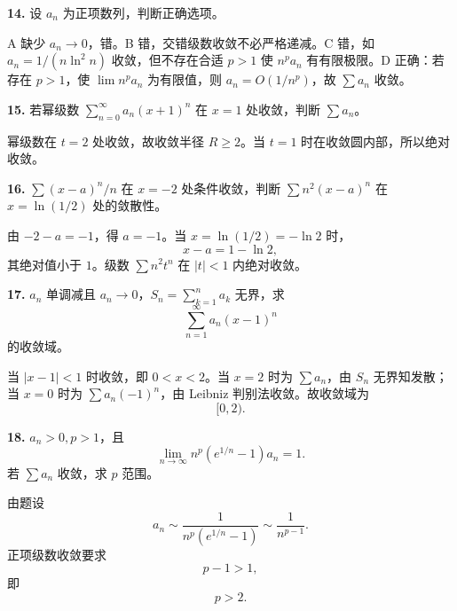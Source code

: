 \begin{problemblock}
\textbf{14.} 设 \(a_n\) 为正项数列，判断正确选项。
\end{problemblock}
\begin{solutionblock}
A 缺少 \(a_n\to0\)，错。B 错，交错级数收敛不必严格递减。C 错，如 \(a_n=1/(n\ln^2 n)\) 收敛，但不存在合适 \(p>1\) 使 \(n^pa_n\) 有有限极限。D 正确：若存在 \(p>1\)，使 \(\lim n^pa_n\) 为有限值，则 \(a_n=O(1/n^p)\)，故 \(\sum a_n\) 收敛。
\end{solutionblock}

\begin{problemblock}
\textbf{15.} 若幂级数 \(\sum_{n=0}^{\infty}a_n(x+1)^n\) 在 \(x=1\) 处收敛，判断 \(\sum a_n\)。
\end{problemblock}
\begin{solutionblock}
幂级数在 \(t=2\) 处收敛，故收敛半径 \(R\ge2\)。当 \(t=1\) 时在收敛圆内部，所以绝对收敛。
\end{solutionblock}

\begin{problemblock}
\textbf{16.} \(\sum (x-a)^n/n\) 在 \(x=-2\) 处条件收敛，判断 \(\sum n^2(x-a)^n\) 在 \(x=\ln(1/2)\) 处的敛散性。
\end{problemblock}
\begin{solutionblock}
由 \(-2-a=-1\)，得 \(a=-1\)。当 \(x=\ln(1/2)=-\ln2\) 时，
\[
x-a=1-\ln2,
\]
其绝对值小于 \(1\)。级数 \(\sum n^2t^n\) 在 \(|t|<1\) 内绝对收敛。
\end{solutionblock}

\begin{problemblock}
\textbf{17.} \(a_n\) 单调减且 \(a_n\to0\)，\(S_n=\sum_{k=1}^n a_k\) 无界，求
\[
\sum_{n=1}^{\infty}a_n(x-1)^n
\]
的收敛域。
\end{problemblock}
\begin{solutionblock}
当 \(|x-1|<1\) 时收敛，即 \(0<x<2\)。当 \(x=2\) 时为 \(\sum a_n\)，由 \(S_n\) 无界知发散；当 \(x=0\) 时为 \(\sum a_n(-1)^n\)，由 Leibniz 判别法收敛。故收敛域为
\[
\boxed{[0,2)}.
\]
\end{solutionblock}

\begin{problemblock}
\textbf{18.} \(a_n>0,p>1\)，且
\[
\lim_{n\to\infty}n^p(e^{1/n}-1)a_n=1.
\]
若 \(\sum a_n\) 收敛，求 \(p\) 范围。
\end{problemblock}
\begin{solutionblock}
由题设
\[
a_n\sim \frac1{n^p(e^{1/n}-1)}\sim\frac1{n^{p-1}}.
\]
正项级数收敛要求
\[
p-1>1,
\]
即
\[
\boxed{p>2}.
\]
\end{solutionblock}

